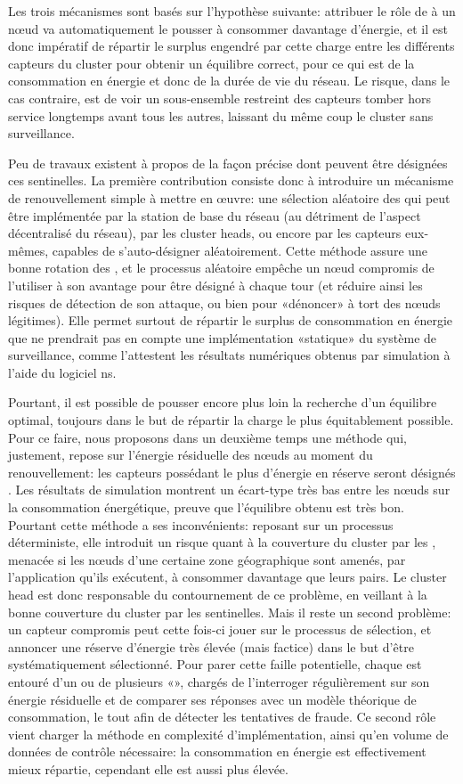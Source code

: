 Les trois mécanismes sont basés sur l'hypothèse suivante: attribuer le rôle de \cnt à un nœud va automatiquement le pousser à consommer davantage d'énergie, et il est donc impératif de répartir le surplus engendré par cette charge entre les différents capteurs du cluster pour obtenir un équilibre correct, pour ce qui est de la consommation en énergie et donc de la durée de vie du réseau.
Le risque, dans le cas contraire, est de voir un sous-ensemble restreint des capteurs tomber hors service longtemps avant tous les autres, laissant du même coup le cluster sans surveillance.

Peu de travaux existent à propos de la façon précise dont peuvent être désignées ces sentinelles.
La première contribution consiste donc à introduire un mécanisme de renouvellement simple à mettre en œuvre: une sélection aléatoire des \cnst qui peut être implémentée par la station de base du réseau (au détriment de l'aspect décentralisé du réseau), par les cluster heads, ou encore par les capteurs eux-mêmes, capables de s'auto-désigner aléatoirement.
Cette méthode assure une bonne rotation des \cnst, et le processus aléatoire empêche un nœud compromis de l'utiliser à son avantage pour être désigné à chaque tour (et réduire ainsi les risques de détection de son attaque, ou bien pour «dénoncer» à tort des nœuds légitimes).
Elle permet surtout de répartir le surplus de consommation en énergie que ne prendrait pas en compte une implémentation «statique» du système de surveillance, comme l'attestent les résultats numériques obtenus par simulation à l'aide du logiciel \textsf{ns}.

Pourtant, il est possible de pousser encore plus loin la recherche d'un équilibre optimal, toujours dans le but de répartir la charge le plus équitablement possible.
Pour ce faire, nous proposons dans un deuxième temps une méthode qui, justement, repose sur l'énergie résiduelle des nœuds au moment du renouvellement: les capteurs possédant le plus d'énergie en réserve seront désignés \cnst.
Les résultats de simulation montrent un écart-type très bas entre les nœuds sur la consommation énergétique, preuve que l'équilibre obtenu est très bon.
Pourtant cette méthode a ses inconvénients: reposant sur un processus déterministe, elle introduit un risque quant à la couverture du cluster par les \cnst, menacée si les nœuds d'une certaine zone géographique sont amenés, par l'application qu'ils exécutent, à consommer davantage que leurs pairs.
Le cluster head est donc responsable du contournement de ce problème, en veillant à la bonne couverture du cluster par les sentinelles.
Mais il reste un second problème: un capteur compromis peut cette fois-ci jouer sur le processus de sélection, et annoncer une réserve d'énergie très élevée (mais factice) dans le but d'être systématiquement sélectionné.
Pour parer cette faille potentielle, chaque \cnt est entouré d'un ou de plusieurs «\vnst», chargés de l'interroger régulièrement sur son énergie résiduelle et de comparer ses réponses avec un modèle théorique de consommation, le tout afin de détecter les tentatives de fraude.
Ce second rôle vient charger la méthode en complexité d'implémentation, ainsi qu'en volume de données de contrôle nécessaire: la consommation en énergie est effectivement mieux répartie, cependant elle est aussi plus élevée.

